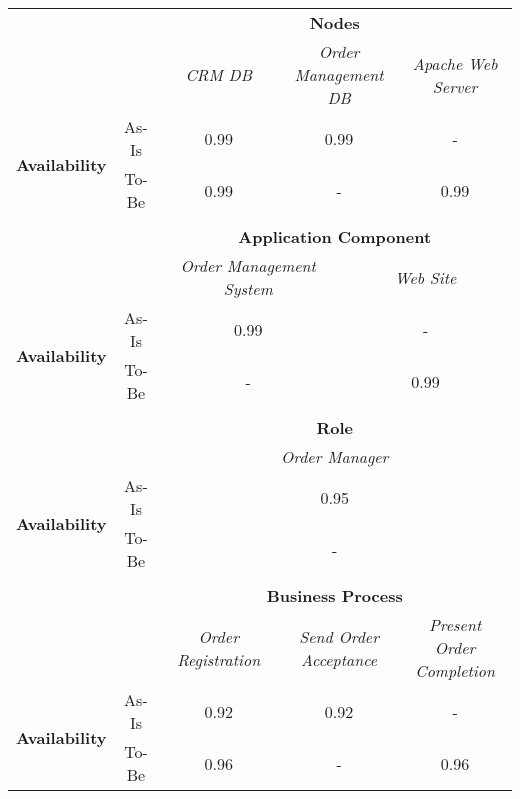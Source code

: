 \begin{table}[H]
	\centering
	\begin{tabular}{|c|c|p{2cm}|p{2.5cm}|p{2.5cm}|p{2.5cm}|}
		\cline{3-6}

		\multicolumn{2}{c}{} & \multicolumn{4}{|c|}{\textbf{Nodes}} \\ \cline{3-6}
		\multicolumn{2}{c|}{} & \multicolumn{1}{c|}{\textsl{CRM DB}} & \multicolumn{2}{c|}{\textsl{Order Management DB}} & \multicolumn{1}{c|}{\textsl{Apache Web Server}} \\
		\hline
		\multirow{2}{*}{\textbf{Availability}} & As-Is & \multicolumn{1}{c|}{0.99} & \multicolumn{2}{c|}{0.99}& \multicolumn{1}{c|}{-} \\ \cline{2-6}
		& To-Be & \multicolumn{1}{c|}{0.99} & \multicolumn{2}{c|}{-}& \multicolumn{1}{c|}{0.99} \\ \hline
		
		\multicolumn{6}{c}{} \\ \cline{3-6}
		\multicolumn{2}{c}{} & \multicolumn{4}{|c|}{\textbf{Application Component}} \\ \cline{3-6}
		\multicolumn{2}{c|}{} & \multicolumn{2}{c|}{\textsl{Order Management System}} & \multicolumn{2}{c|}{\textsl{Web Site}}  \\
		\hline
		\multirow{2}{*}{\textbf{Availability}} & As-Is & \multicolumn{2}{c|}{0.99} & \multicolumn{2}{c|}{-} \\ \cline{2-6}
		& To-Be & \multicolumn{2}{c|}{-} & \multicolumn{2}{c|}{0.99} \\ \hline
		
		\multicolumn{6}{c}{} \\ \cline{3-6}
		\multicolumn{2}{c}{} & \multicolumn{4}{|c|}{\textbf{Role}} \\ \cline{3-6}
		\multicolumn{2}{c|}{} & \multicolumn{4}{c|}{\textsl{Order Manager}} \\
		\hline
		\multirow{2}{*}{\textbf{Availability}} &As-Is & \multicolumn{4}{c|}{0.95}  \\ \cline{2-6}
		& To-Be & \multicolumn{4}{c|}{-}\\ \hline

		\multicolumn{6}{c}{} \\ \cline{3-6}
		\multicolumn{2}{c}{} & \multicolumn{4}{|c|}{\textbf{Business Process}} \\ \cline{3-6}
		\multicolumn{2}{c|}{} & \multicolumn{1}{c|}{\textsl{Order Registration}} & \multicolumn{2}{c|}{\textsl{Send Order Acceptance}} & \multicolumn{1}{c|}{\textsl{Present Order Completion}}\\
		\hline
		\multirow{2}{*}{\textbf{Availability}} & As-Is & \multicolumn{1}{c|}{0.92} & \multicolumn{2}{c|}{0.92} & \multicolumn{1}{c|}{-} \\ \cline{2-6}
		& To-Be & \multicolumn{1}{c|}{0.96} & \multicolumn{2}{c|}{-} & \multicolumn{1}{c|}{0.96} \\ \hline


\end{tabular}
\end{table}
